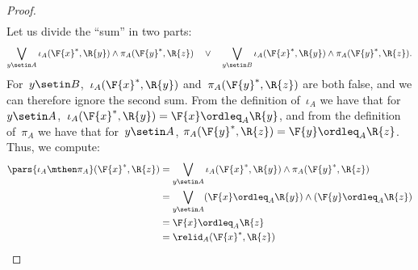 \begin{proof}
\begin{equation}
\begin{aligned}
        \end{aligned}
    \end{equation}
    Let us divide the ``sum'' in two parts:
    \begin{equation}
        \bigvee_{y \setin A} \iota_A(\F{x}^*,\R{y}) \wedge \pi_A(\F{y}^*,\R{z}) \quad\vee\quad
        \bigvee_{y \setin B} \iota_A(\F{x}^*,\R{y}) \wedge \pi_A(\F{y}^*,\R{z}).
    \end{equation}
    For~$y \setin B$,~$\iota_A(\F{x}^*,\R{y})$ and~$\pi_A(\F{y}^*,\R{z})$ are both false, and we can therefore ignore the second sum.
    From the definition of~$\iota_A$ we have that for~$y\setin A$,~$ \iota_A(\F{x}^*,\R{y})=\F{x} \ordleq_A \R{y}$, and from the definition of~$\pi_A$ we have that for~$y\setin A$, $\pi_A(\F{y}^*,\R{z})=\F{y} \ordleq_A \R{z}$.
    Thus, we compute:
    \begin{equation}
        \begin{aligned}
            \pars{\iota_A\mthen \pi_A}(\F{x}^*, \R{z}) & = \bigvee_{y \setin A} \iota_A(\F{x}^*,\R{y}) \wedge \pi_A(\F{y}^*,\R{z}) \\
                                                             & = \bigvee_{y \setin A} (\F{x} \ordleq_A \R{y}) \wedge  (\F{y} \ordleq_A \R{z}) \\
                                                             & = \F{x} \ordleq_A \R{z} \\
                                                             & = \relid_A(\F{x}^*, \R{z})
        \end{aligned}
    \end{equation}
\end{proof}

